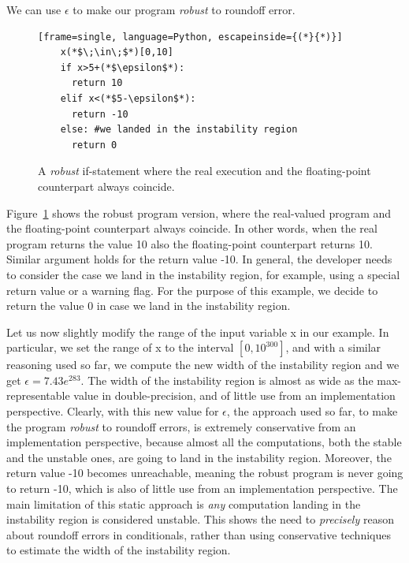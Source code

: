 We can use $\epsilon$ to make our program \emph{robust} to roundoff error.
%
\begin{figure}[tb!]
	\begin{lstlisting}[frame=single, language=Python, escapeinside={(*}{*)}]
	x(*$\;\in\;$*)[0,10]
	if x>5+(*$\epsilon$*):
	  return 10
	elif x<(*$5-\epsilon$*):
	  return -10
	else: #we landed in the instability region
	  return 0
	\end{lstlisting}
	\caption{A \emph{robust} if-statement where the real execution and the floating-point counterpart always coincide.}
	\label{fig:ifrobust}
\end{figure}
%
Figure~\ref{fig:ifrobust} shows the robust program version, where the real-valued program and the floating-point counterpart always coincide. 
%
In other words, when the real program returns the value 10 also the floating-point counterpart returns 10. Similar argument holds for the return value -10.
%
In general, the developer needs to consider the case we land in the instability region, for example, using a special return value or a warning flag.
%
For the purpose of this example, we decide to return the value $0$ in case we land in the instability region. 

%

Let us now slightly modify the range of the input variable x in our example. 
%
In particular, we set the range of x to the interval $[0, 10^{300}]$, and with a similar reasoning used so far, we compute the new width of the instability region and we get $\epsilon=7.43e^{283}$.
%
The width of the instability region is almost as wide as the max-representable value in double-precision, and of little use from an implementation perspective. 
%
Clearly, with this new value for $\epsilon$, the approach used so far, to make the program \emph{robust} to roundoff errors, is extremely conservative from an implementation perspective, because almost all the computations, both the stable and the unstable ones, are going to land in the instability region.
%
Moreover, the return value -10 becomes unreachable, meaning the robust program is never going to return -10, which is also of little use from an implementation perspective.
%
The main limitation of this static approach is \emph{any} computation landing in the instability region is considered unstable.
%
This shows the need to \emph{precisely} reason about roundoff errors in conditionals, rather than using conservative techniques to estimate the width of the instability region.
%

